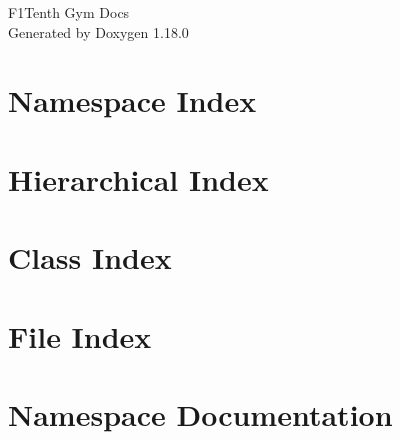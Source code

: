 \documentclass[twoside]{book}
\newcommand{\+}{\discretionary{\mbox{\scriptsize$\hookleftarrow$}}{}{}}
\newcommand{\clearemptydoublepage}{%
    \newpage{\pagestyle{empty}\cleardoublepage}%
  }
\begin{document}
  \raggedbottom
    \hypersetup{pageanchor=false,
                bookmarksnumbered=true,
                pdfencoding=unicode
               }
  \begin{titlepage}
  \vspace*{7cm}
  \begin{center}%
  {\Large F1\+Tenth Gym Docs}\\
  \vspace*{1cm}
  {\large Generated by Doxygen 1.18.0}\\
  \end{center}
  \end{titlepage}
  \clearemptydoublepage
  \tableofcontents
  \clearemptydoublepage
  \hypersetup{pageanchor=true}
\chapter{Namespace Index}

\chapter{Hierarchical Index}

\chapter{Class Index}

\chapter{File Index}

\chapter{Namespace Documentation}



\end{document}
